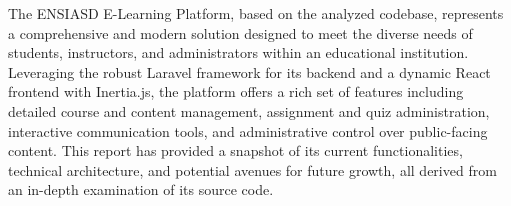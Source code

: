 The ENSIASD E-Learning Platform, based on the analyzed codebase, represents a comprehensive and modern solution designed to meet the diverse needs of students, instructors, and administrators within an educational institution. Leveraging the robust Laravel framework for its backend and a dynamic React frontend with Inertia.js, the platform offers a rich set of features including detailed course and content management, assignment and quiz administration, interactive communication tools, and administrative control over public-facing content. This report has provided a snapshot of its current functionalities, technical architecture, and potential avenues for future growth, all derived from an in-depth examination of its source code.
